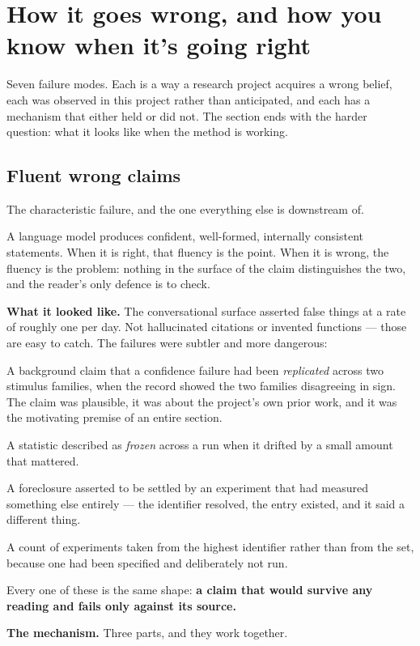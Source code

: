 \section{How it goes wrong, and how you know when it's going right}

Seven failure modes. Each is a way a research project acquires a wrong belief, each was observed in this project rather than anticipated, and each has a mechanism that either held or did not. The section ends with the harder question: what it looks like when the method is working.

\subsection{Fluent wrong claims}

The characteristic failure, and the one everything else is downstream of.

A language model produces confident, well-formed, internally consistent statements. When it is right, that fluency is the point. When it is wrong, the fluency is the problem: nothing in the surface of the claim distinguishes the two, and the reader's only defence is to check.

\textbf{What it looked like.} The conversational surface asserted false things at a rate of roughly one per day. Not hallucinated citations or invented functions --- those are easy to catch. The failures were subtler and more dangerous:

A background claim that a confidence failure had been \textit{replicated} across two stimulus families, when the record showed the two families disagreeing in sign. The claim was plausible, it was about the project's own prior work, and it was the motivating premise of an entire section.

A statistic described as \textit{frozen} across a run when it drifted by a small amount that mattered.

A foreclosure asserted to be settled by an experiment that had measured something else entirely --- the identifier resolved, the entry existed, and it said a different thing.

A count of experiments taken from the highest identifier rather than from the set, because one had been specified and deliberately not run.

Every one of these is the same shape: \textbf{a claim that would survive any reading and fails only against its source.}

\textbf{The mechanism.} Three parts, and they work together.

